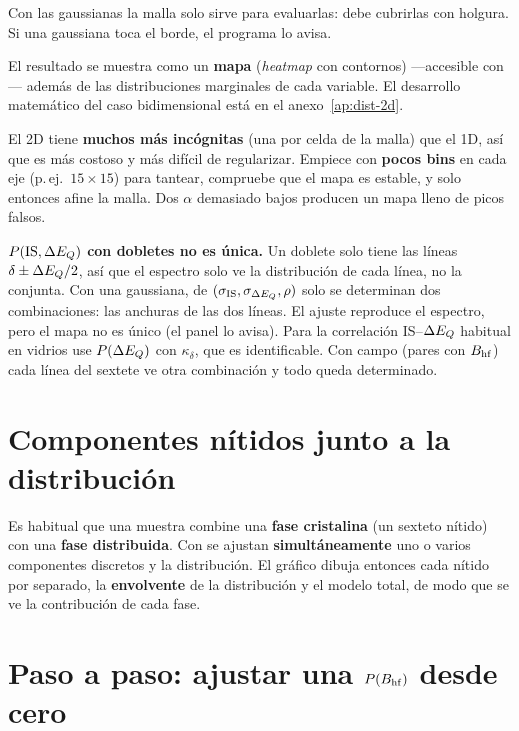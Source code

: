 Con las gaussianas la malla solo sirve para evaluarlas: debe cubrirlas con
holgura. Si una gaussiana toca el borde, el programa lo avisa.

El resultado se muestra como un \textbf{mapa} (\emph{heatmap} con contornos)
—accesible con — además de las distribuciones marginales de
cada variable. El desarrollo matemático del caso bidimensional está en el
anexo~\ref{ap:dist-2d}.

\begin{aviso}
El 2D tiene \textbf{muchos más incógnitas} (una por celda de la malla) que el 1D,
así que es más costoso y más difícil de regularizar. Empiece con \textbf{pocos
bins} en cada eje (p.\,ej.\ $15\times15$) para tantear, compruebe que el mapa es
estable, y solo entonces afine la malla. Dos $\alpha$ demasiado bajos producen un
mapa lleno de picos falsos.
\end{aviso}

\begin{aviso}
\textbf{$P(\text{IS}, \Delta E_{Q})$ con dobletes no es única.} Un doblete solo tiene las
líneas $\delta \pm \Delta E_{Q}/2$, así que el espectro solo ve la distribución de
cada línea, no la conjunta. Con una gaussiana, de $(\sigma_{\text{IS}},
\sigma_{\Delta E_{Q}}, \rho)$ solo se determinan dos combinaciones: las anchuras de las
dos líneas. El ajuste reproduce el espectro, pero el mapa no es único (el panel lo
avisa). Para la correlación IS--$\Delta E_{Q}$ habitual en vidrios use $P(\Delta E_{Q})$ con
$\kappa_\delta$, que es identificable. Con campo (pares con $B_{\mathrm{hf}}$) cada línea del
sextete ve otra combinación y todo queda determinado.
\end{aviso}

\section{Componentes nítidos junto a la distribución}
\label{sec:nitidos}

Es habitual que una muestra combine una \textbf{fase cristalina} (un sexteto
nítido) con una \textbf{fase distribuida}. Con  se ajustan \textbf{simultáneamente} uno o varios componentes
discretos y la distribución. El gráfico dibuja entonces cada nítido por separado,
la \textbf{envolvente} de la distribución y el modelo total, de modo que se ve la
contribución de cada fase.

\section{Paso a paso: ajustar una \texorpdfstring{$P(B_{\mathrm{hf}})$}{P(BHF)} desde cero}
\label{sec:paso-a-paso}

